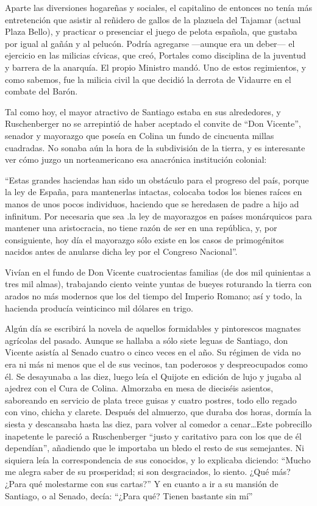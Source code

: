 \documentclass[10pt,twoside,openright]{memoir}
\begin{document}
Aparte las diversiones hogareñas y sociales, el capitalino de entonces
no tenía más entretención que asistir al reñidero de gallos de la
plazuela del Tajamar (actual Plaza Bello), y practicar o presenciar el
juego de pelota española, que gustaba por igual al gañán y al pelucón.
Podría agregarse ---aunque era un deber--- el ejercicio en las milicias
cívicas, que creó, Portales como disciplina de la juventud y barrera de
la anarquía. El propio Ministro mandó. Uno de estos regimientos, y como
sabemos, fue la milicia civil la que decidió la derrota de Vidaurre en
el combate del Barón.

Tal como hoy, el mayor atractivo de Santiago estaba en sus alrededores,
y Ruschenberger no se arrepintió de haber aceptado el convite de ``Don
Vicente'', senador y mayorazgo que poseía en Colina un fundo de cincuenta
millas cuadradas. No sonaba aún la hora de la subdivisión de la tierra,
y es interesante ver cómo juzgo un norteamericano esa anacrónica
institución colonial:

``Estas grandes haciendas han sido un obstáculo para el progreso del
país, porque la ley de España, para mantenerlas intactas, colocaba todos
los bienes raíces en manos de unos pocos individuos, haciendo que se
heredasen de padre a hijo ad infinitum. Por necesaria que sea .la ley de
mayorazgos en países monárquicos para mantener una aristocracia, no
tiene razón de ser en una república, y, por consiguiente, hoy día el
mayorazgo sólo existe en los casos de primogénitos nacidos antes de
anularse dicha ley por el Congreso Nacional''.

Vivían en el fundo de Don Vicente cuatrocientas familias (de dos mil
quinientas a tres mil almas), trabajando ciento veinte yuntas de bueyes
roturando la tierra con arados no más modernos que los del tiempo del
Imperio Romano; así y todo, la hacienda producía veinticinco mil dólares
en trigo.

Algún día se escribirá la novela de aquellos formidables y pintorescos
magnates agrícolas del pasado. Aunque se hallaba a sólo siete leguas de
Santiago, don Vicente asistía al Senado cuatro o cinco veces en el año.
Su régimen de vida no era ni más ni menos que el de sus vecinos, tan
poderosos y despreocupados como él. Se desayunaba a las diez, luego leía
el Quijote en edición de lujo y jugaba al ajedrez con el Cura de Colina.
Almorzaba en mesa de dieciséis asientos, saboreando en servicio de plata
trece guisas y cuatro postres, todo ello regado con vino, chicha y
clarete. Después del almuerzo, que duraba dos horas, dormía la siesta y
descansaba hasta las diez, para volver al comedor a cenar\ldots Este
pobrecillo inapetente le pareció a Ruschenberger ``justo y caritativo
para con los que de él dependían'', añadiendo que le importaba un bledo
el resto de sus semejantes. Ni siquiera leía la correspondencia de sus
conocidos, y lo explicaba diciendo: ``Mucho me alegra saber de su
prosperidad; si son desgraciados, lo siento. ¿Qué más? ¿Para qué
molestarme con sus cartas?'' Y en cuanto a ir a su mansión de Santiago, o
al Senado, decía: ``¿Para qué? Tienen bastante sin mí''
\end{document}
